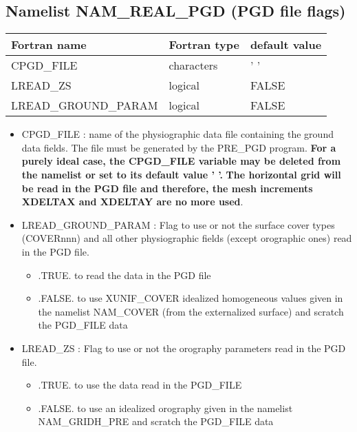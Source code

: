 \subsection{Namelist NAM\_REAL\_PGD (PGD file flags) }

\begin{center}
\begin{tabular} {|l|l|l|}
\hline
Fortran name & Fortran type & default value \\
\hline
CPGD\_FILE          & characters & '   ' \\
LREAD\_ZS           & logical    & FALSE \\ 
LREAD\_GROUND\_PARAM & logical    & FALSE \\
\hline
\end{tabular}
\end{center}


\begin{itemize}
\item CPGD\_FILE : name of the physiographic data file containing the ground data
                   fields. The file must be generated by the PRE\_PGD program.
{\bf For a purely ideal case, the CPGD\_FILE variable may be deleted from the
namelist or set to its default value '   '.}
{\bf The horizontal grid will be read in the PGD file and therefore, the mesh
increments XDELTAX and XDELTAY are no more used}.

\item LREAD\_GROUND\_PARAM : Flag to use or not the surface cover types (COVERnnn)
                             and all other physiographic fields (except orographic ones)
                             read in the PGD file.
\begin{itemize}
\item .TRUE. to read the data in the PGD file 
\item .FALSE. to use XUNIF\_COVER idealized homogeneous values given in the
namelist NAM\_COVER (from the externalized surface) and scratch the PGD\_FILE  data
\end{itemize}


\item LREAD\_ZS : Flag to use or not the orography parameters 
                  read in the PGD file.
\begin{itemize}
\item .TRUE. to use the data read in the PGD\_FILE 
\item .FALSE. to use an idealized orography given in the
namelist NAM\_GRIDH\_PRE and scratch the PGD\_FILE  data
\end{itemize}

\end{itemize}



